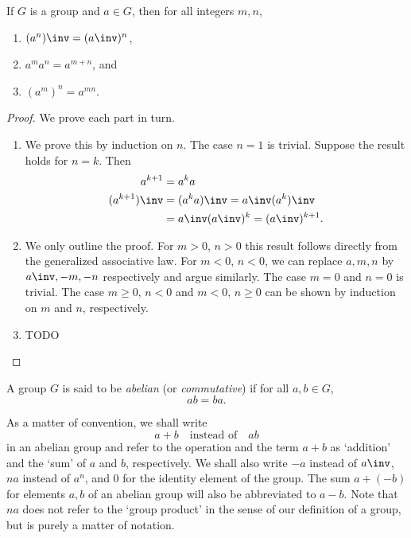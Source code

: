 \begin{theorem}
    If \(G\) is a group and \(a \in G\), then for all integers \(m, n\),
    \begin{enumerate}[label=(\alph*)]
        \item \((a^n)\inv = (a\inv)^n\),
        \item \(a^m a^n = a^{m + n}\), and
        \item \((a^m)^n = a^{mn}\).
    \end{enumerate}
\end{theorem}

\begin{proof}
    We prove each part in turn.
    \begin{enumerate}[label=(\alph*), wide]
        \item We prove this by induction on \(n\). The case \(n = 1\) is
        trivial. Suppose the result holds for \(n = k\). Then
        \begin{align*}
            a^{k + 1} & = a^k a\\
            (a^{k + 1})\inv & = (a^k a)\inv = a\inv (a^k)\inv\\
            & = a\inv (a\inv)^k = (a\inv)^{k + 1}.
        \end{align*}
        \item We only outline the proof. For \(m > 0\), \(n > 0\) this result
        follows directly from the generalized associative law. For \(m < 0\),
        \(n < 0\), we can replace \(a, m, n\) by \(a\inv, -m, -n\) respectively
        and argue similarly. The case \(m = 0\) and \(n = 0\) is trivial. The
        case \(m \geq 0\), \(n < 0\) and \(m < 0\), \(n \geq 0\) can be shown by
        induction on \(m\) and \(n\), respectively.
        
        \item TODO

    \end{enumerate}
\end{proof}


\begin{definition}
    A group \(G\) is said to be \emph{abelian} (or \emph{commutative}) if for
    all \(a, b \in G\),
    \[
        ab = ba.
    \]
\end{definition}

\begin{remark}
    As a matter of convention, we shall write
    \[
        a + b \quad \text{instead of} \quad ab
    \]
    in an abelian group and refer to the operation and the term \(a + b\) as
    `addition' and the `sum' of \(a\) and \(b\), respectively. We shall also
    write \(-a\) instead of \(a\inv\), \(na\) instead of \(a^n\), and \(0\) for
    the identity element of the group. The sum \(a + (-b)\) for elements \(a,
    b\) of an abelian group will also be abbreviated to \(a - b\). Note that
    \(na\) does not refer to the `group product' in the sense of our definition
    of a group, but is purely a matter of notation.
\end{remark}

